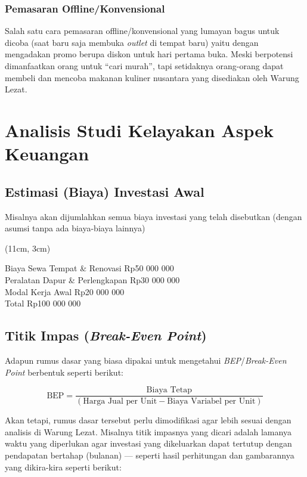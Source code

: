 \subsubsection{Pemasaran Offline/Konvensional}

Salah satu cara pemasaran offline/konvensional yang lumayan bagus untuk dicoba (saat baru saja membuka \textit{outlet} di tempat baru) yaitu dengan mengadakan promo berupa diskon untuk hari pertama buka. Meski berpotensi dimanfaatkan orang untuk “cari murah”, tapi setidaknya orang-orang dapat membeli dan mencoba makanan kuliner nusantara yang disediakan oleh Warung Lezat.



\section{Analisis Studi Kelayakan Aspek Keuangan}

\subsection{Estimasi (Biaya) Investasi Awal}

Misalnya akan dijumlahkan semua biaya investasi yang telah disebutkan (dengan asumsi tanpa ada biaya-biaya lainnya)

\begin{center}
    \framebox(11cm, 3cm){
        \parbox{10cm}{
            Biaya Sewa Tempat \& Renovasi \hfill Rp50 000 000 \\
            Peralatan Dapur \& Perlengkapan \hfill Rp30 000 000 \\
            Modal Kerja Awal \hfill Rp20 000 000 \\
            Total \hfill Rp100 000 000
        }
    }
\end{center}

\subsection{Titik Impas (\textit{Break-Even Point})}

Adapun rumus dasar yang biasa dipakai untuk mengetahui \textit{BEP}/\textit{Break-Even Point} berbentuk seperti berikut:

\[
    \text{BEP} = \frac{\text{Biaya Tetap}}{\left(\text{Harga Jual per Unit} - \text{Biaya Variabel per Unit}\right)}
\]

Akan tetapi, rumus dasar tersebut perlu dimodifikasi agar lebih sesuai dengan analisis di Warung Lezat. Misalnya titik impasnya yang dicari adalah lamanya waktu yang diperlukan agar investasi yang dikeluarkan dapat tertutup dengan pendapatan bertahap (bulanan) — seperti hasil perhitungan dan gambarannya yang dikira-kira seperti berikut:

